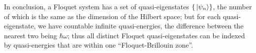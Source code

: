 \documentclass[hyperref, a4paper]{article}
\begin{document}
In conclusion, a Floquet system has a set of quasi-eigenstates $\{ \ket*{\psi_n} \}$,
the number of which is the same as 
the dimension of the Hilbert space;
but for each quasi-eigenstate,
we have countable infinite quasi-energies,
the difference between the nearest two being $\hbar \omega$;
thus all distinct Floquet quasi-eigenstates can be indexed 
by quasi-energies that are within one ``Floquet-Brillouin zone''.
\end{document}
